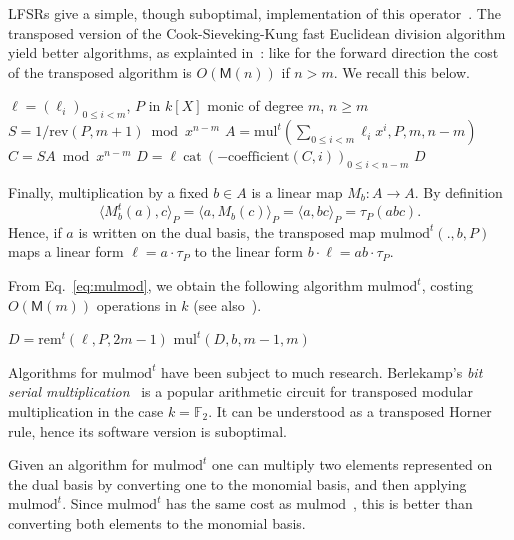 \documentclass[12pt]{article}
\def\M {\ensuremath{\mathsf{M}}}
\def\F {\ensuremath{\mathbb{F}}}
\def\mul {\ensuremath{\mathrm{mul}}}
\def\rem {\ensuremath{\mathrm{rem}}}
\def\cat {\ensuremath{\mathrm{cat}}}
\def\coeff {\ensuremath{\mathrm{coefficient}}}
\def\mulmod {\ensuremath{\mathrm{mulmod}}}
\def\rev {\ensuremath{\mathrm{rev}}}
\newcommand{\ang}[1]{\langle#1\rangle}
\begin{document}
LFSRs give a simple, though suboptimal, implementation of this
operator~\cite{todo}. The transposed version of the
Cook-Sieveking-Kung fast Euclidean division algorithm yield better
algorithms, as explainted in~\cite{bostan+lecerf+schost:tellegen}:
like for the forward direction the cost of the transposed algorithm is
$O(\M(n))$ if $n>m$. We recall this below.

\begin{algorithm}[H]
  \caption{$\rem^t(\ell,P,k)$}
  \begin{algorithmic}[1]
    \REQUIRE $\ell=(\ell_i)_{0 \le i < m}$, $P$ in $k[X]$ monic of degree $m$, $n \ge m$
    \STATE $S = 1/\rev(P, m+1) \bmod x^{n-m}$
    \STATE $A = \mul^t( \sum_{0 \le i < m} \ell_{i}x^i, P, m, n-m)$
    \STATE $C = S A \bmod x^{n-m}$
    \STATE $D = \ell ~\cat~ (-\coeff(C,i))_{0 \le i < n-m}$
    \RETURN $D$
  \end{algorithmic}
\end{algorithm}

Finally, multiplication by a fixed $b\in A$ is a linear map $M_b:A\to
A$. By definition
\begin{equation}
  \label{eq:mulmodt-def}
  \ang{M_b^t(a),c}_P = \ang{a,M_b(c)}_P = \ang{a,bc}_P = \tau_P(abc).
\end{equation}
Hence, if $a$ is written on the dual basis, the transposed map
$\mulmod^t(.,b,P)$ maps a linear form $\ell = a\cdot\tau_P$ to the
linear form $b \cdot \ell=ab\cdot\tau_P$.  

From Eq.~\eqref{eq:mulmod},
we obtain the following algorithm $\mulmod^t$, costing $O(\M(m))$
operations in $k$ (see
also~\cite{shoup99,bostan+lecerf+schost:tellegen}).


\begin{algorithm}[H]
  \caption{$\mulmod^t(\ell,b,P)$}
  \begin{algorithmic}[1]
    \STATE $D = \rem^t(\ell,P,2m-1)$
    \RETURN $\mul^t(D, b, m-1, m)$
  \end{algorithmic}
\end{algorithm}

Algorithms for $\mulmod^t$ have been subject to much
research. Berlekamp's \emph{bit serial multiplication}~\cite{todo} is
a popular arithmetic circuit for transposed modular multiplication in
the case $k=\F_2$. It can be understood as a transposed Horner
rule, hence its software version is suboptimal.

Given an algorithm for $\mulmod^t$ one can multiply two elements
represented on the dual basis by converting one to the monomial basis,
and then applying $\mulmod^t$. Since $\mulmod^t$ has the same cost as
$\mulmod$~\cite{shoup99,bostan+lecerf+schost:tellegen}, this is better
than converting both elements to the monomial basis.
\end{document}
